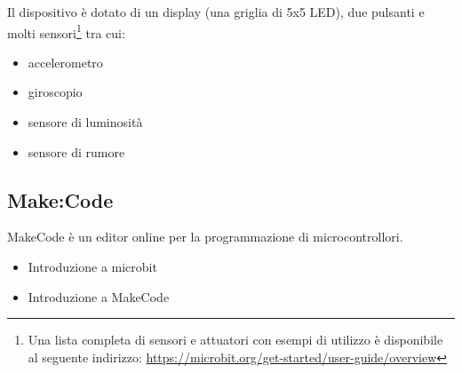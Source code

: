 \documentclass[../../docenti.tex]{subfiles}
\begin{document}
Il dispositivo è dotato di un display (una griglia di 5x5 LED), due pulsanti e molti sensori\footnote{Una lista completa di sensori e attuatori con esempi di utilizzo è disponibile al seguente indirizzo: \url{https://microbit.org/get-started/user-guide/overview}} tra cui:
\begin{itemize}
	\item accelerometro
	\item giroscopio
	\item sensore di luminosità
	\item sensore di rumore
\end{itemize}

\subsection{Make:Code}
MakeCode è un editor online per la programmazione di microcontrollori.\\



\newpage
\begin{itemize}
	\item Introduzione a microbit 
	\item Introduzione a MakeCode
\end{itemize}
\end{document}
